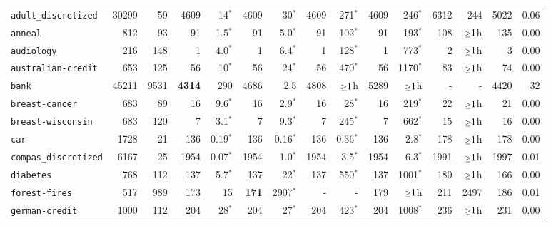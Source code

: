 \begin{tabular}{lccrrrrrrrrrrrr}
\texttt{adult\_discretized} & \multicolumn{1}{r}{30299} & \multicolumn{1}{r}{59}  & 4609 & 14$^*$ & 4609 & 30$^*$ & 4609 & 271$^*$ & 4609 & 246$^*$ & 6312 & 244 & 5022 & 0.06\\
\texttt{anneal} & \multicolumn{1}{r}{812} & \multicolumn{1}{r}{93}  & 91 & 1.5$^*$ & 91 & 5.0$^*$ & 91 & 102$^*$ & 91 & 193$^*$ & 108 & $\mathsmaller{\geq}1$h & 135 & 0.00\\
\texttt{audiology} & \multicolumn{1}{r}{216} & \multicolumn{1}{r}{148}  & 1 & 4.0$^*$ & 1 & 6.4$^*$ & 1 & 128$^*$ & 1 & 773$^*$ & 2 & $\mathsmaller{\geq}1$h & 3 & 0.00\\
\texttt{australian-credit} & \multicolumn{1}{r}{653} & \multicolumn{1}{r}{125}  & 56 & 10$^*$ & 56 & 24$^*$ & 56 & 470$^*$ & 56 & 1170$^*$ & 83 & $\mathsmaller{\geq}1$h & 74 & 0.00\\
\texttt{bank} & \multicolumn{1}{r}{45211} & \multicolumn{1}{r}{9531}  & \textbf{4314} & 290 & 4686 & 2.5 & 4808 & $\mathsmaller{\geq}1$h & 5289 & $\mathsmaller{\geq}1$h & - & - & 4420 & 32\\
\texttt{breast-cancer} & \multicolumn{1}{r}{683} & \multicolumn{1}{r}{89}  & 16 & 9.6$^*$ & 16 & 2.9$^*$ & 16 & 28$^*$ & 16 & 219$^*$ & 22 & $\mathsmaller{\geq}1$h & 21 & 0.00\\
\texttt{breast-wisconsin} & \multicolumn{1}{r}{683} & \multicolumn{1}{r}{120}  & 7 & 3.1$^*$ & 7 & 9.3$^*$ & 7 & 245$^*$ & 7 & 662$^*$ & 15 & $\mathsmaller{\geq}1$h & 16 & 0.00\\
\texttt{car} & \multicolumn{1}{r}{1728} & \multicolumn{1}{r}{21}  & 136 & 0.19$^*$ & 136 & 0.16$^*$ & 136 & 0.36$^*$ & 136 & 2.8$^*$ & 178 & $\mathsmaller{\geq}1$h & 178 & 0.00\\
\texttt{compas\_discretized} & \multicolumn{1}{r}{6167} & \multicolumn{1}{r}{25}  & 1954 & 0.07$^*$ & 1954 & 1.0$^*$ & 1954 & 3.5$^*$ & 1954 & 6.3$^*$ & 1991 & $\mathsmaller{\geq}1$h & 1997 & 0.01\\
\texttt{diabetes} & \multicolumn{1}{r}{768} & \multicolumn{1}{r}{112}  & 137 & 5.7$^*$ & 137 & 22$^*$ & 137 & 550$^*$ & 137 & 1001$^*$ & 180 & $\mathsmaller{\geq}1$h & 166 & 0.00\\
\texttt{forest-fires} & \multicolumn{1}{r}{517} & \multicolumn{1}{r}{989}  & 173 & 15 & \textbf{171} & 2907$^*$ & - & - & 179 & $\mathsmaller{\geq}1$h & 211 & 2497 & 186 & 0.01\\
\texttt{german-credit} & \multicolumn{1}{r}{1000} & \multicolumn{1}{r}{112}  & 204 & 28$^*$ & 204 & 27$^*$ & 204 & 423$^*$ & 204 & 1008$^*$ & 236 & $\mathsmaller{\geq}1$h & 231 & 0.00\\

\end{tabular}
